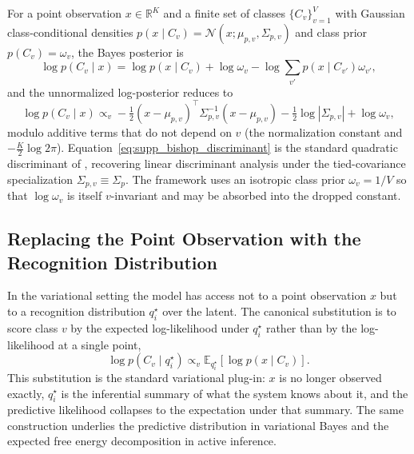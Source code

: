 \documentclass[twoside,11pt]{article}
\begin{document}
For a point observation $x \in \mathbb{R}^K$ and a finite set of classes $\{C_v\}_{v=1}^V$ with Gaussian class-conditional densities $p(x \mid C_v) = \mathcal{N}(x;\mu_{p,v}, \Sigma_{p,v})$ and class prior $p(C_v) = \omega_v$, the Bayes posterior is
\begin{equation}
\log p(C_v \mid x)
= \log p(x \mid C_v) + \log \omega_v - \log \sum_{v'} p(x \mid C_{v'}) \omega_{v'},
\label{eq:supp_bishop_bayes}
\end{equation}
and the unnormalized log-posterior reduces to
\begin{equation}
\log p(C_v \mid x) \propto_v -\tfrac{1}{2}(x - \mu_{p,v})^{\top} \Sigma_{p,v}^{-1} (x - \mu_{p,v})
- \tfrac{1}{2}\log|\Sigma_{p,v}|
+ \log \omega_v,
\label{eq:supp_bishop_discriminant}
\end{equation}
modulo additive terms that do not depend on $v$ (the normalization constant and $-\tfrac{K}{2}\log 2\pi$). Equation~\eqref{eq:supp_bishop_discriminant} is the standard quadratic discriminant of \cite[\S4.2.1]{Bishop2006}, recovering linear discriminant analysis under the tied-covariance specialization $\Sigma_{p,v} \equiv \Sigma_p$. The framework uses an isotropic class prior $\omega_v = 1/V$ so that $\log \omega_v$ is itself $v$-invariant and may be absorbed into the dropped constant.

\subsection{Replacing the Point Observation with the Recognition Distribution}

In the variational setting the model has access not to a point observation $x$ but to a recognition distribution $q_i^{\star}$ over the latent. The canonical substitution is to score class $v$ by the expected log-likelihood under $q_i^{\star}$ rather than by the log-likelihood at a single point,
\begin{equation}
\log p(C_v \mid q_i^{\star}) \propto_v \mathbb{E}_{q_i^{\star}}[\log p(x \mid C_v)].
\label{eq:supp_q_substitution}
\end{equation}
This substitution is the standard variational plug-in: $x$ is no longer observed exactly, $q_i^{\star}$ is the inferential summary of what the system knows about it, and the predictive likelihood collapses to the expectation under that summary. The same construction underlies the predictive distribution in variational Bayes \cite[Eq.~5]{Blei2017} and the expected free energy decomposition in active inference.
\end{document}

